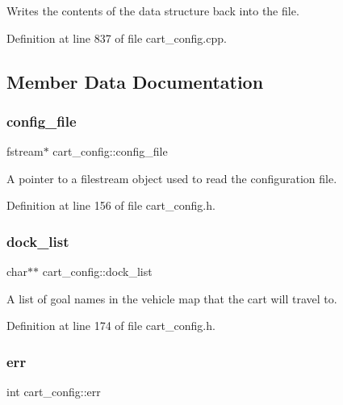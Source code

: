Writes the contents of the data structure back into the file. 

Definition at line 837 of file cart\+\_\+config.\+cpp.



\subsection{Member Data Documentation}
\mbox{\label{classcart__config_a471d3cd9fe8d8722e43194c55a45e976}} 
\subsubsection{\texorpdfstring{config\+\_\+file}{config\_file}}
{\footnotesize\ttfamily fstream$\ast$ cart\+\_\+config\+::config\+\_\+file\hspace{0.3cm}{\ttfamily [private]}}

A pointer to a filestream object used to read the configuration file. 

Definition at line 156 of file cart\+\_\+config.\+h.

\mbox{\label{classcart__config_a3b73d8e5b48ba87502d77028ec765023}} 
\subsubsection{\texorpdfstring{dock\+\_\+list}{dock\_list}}
{\footnotesize\ttfamily char$\ast$$\ast$ cart\+\_\+config\+::dock\+\_\+list\hspace{0.3cm}{\ttfamily [private]}}

A list of goal names in the vehicle map that the cart will travel to. 

Definition at line 174 of file cart\+\_\+config.\+h.

\mbox{\label{classcart__config_a5b331a578d28d3abec6625ac8952fe37}} 
\subsubsection{\texorpdfstring{err}{err}}
{\footnotesize\ttfamily int cart\+\_\+config\+::err\hspace{0.3cm}{\ttfamily [private]}}

